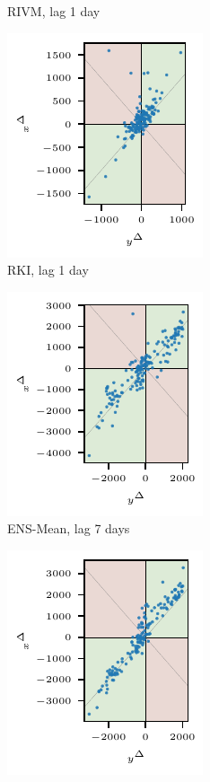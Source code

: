\begin{figure}
\begin{subfigure}[t]{0.23\textwidth}
    \caption{RIVM, lag 1 day}\label{fig:app-covid-4q-rivm-1}
\end{subfigure}\hspace{0.01\textwidth}%
\begin{subfigure}[t]{0.23\textwidth}
    \includegraphics{plots/covid_nowcast/30_RKI_4q_lag_1}
    \caption{RKI, lag 1 day}\label{fig:app-covid-4q-rki-1}
\end{subfigure}
\begin{subfigure}[t]{0.23\textwidth}
    \includegraphics{plots/covid_nowcast/30_ENS-MEAN_4q_lag_7}
    \caption{ENS-Mean, lag 7 days}\label{fig:app-covid-4q-ens-mean-7}
\end{subfigure}\hspace{0.01\textwidth}%
\begin{subfigure}[t]{0.23\textwidth}
    \includegraphics{plots/covid_nowcast/30_ILM_4q_lag_7}

\end{subfigure}
\end{figure}
